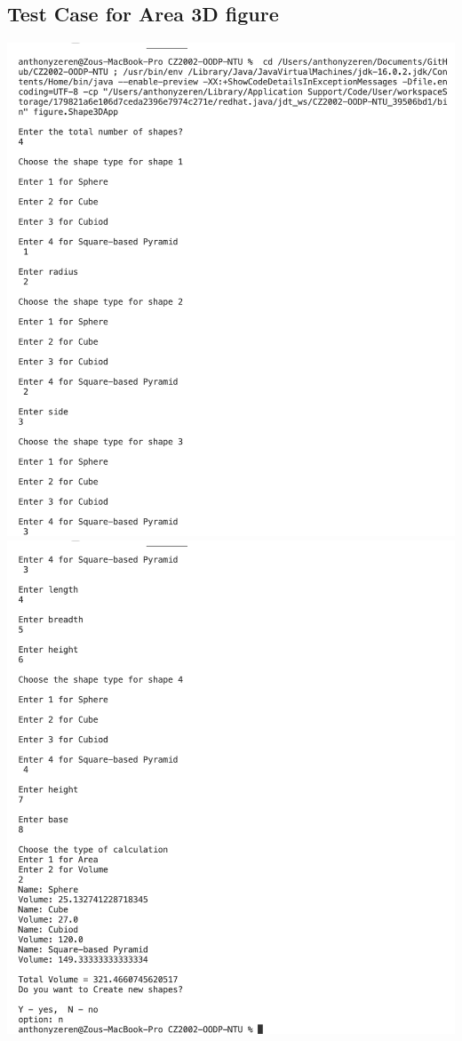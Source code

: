\documentclass[hidelinks,12pt]{article}
\begin{document}
\subsection{Test Case for Area 3D figure}

\includegraphics[scale=0.4]{tc3D1.png}
\includegraphics[scale=0.4]{tc3D2.png}
\end{document}

